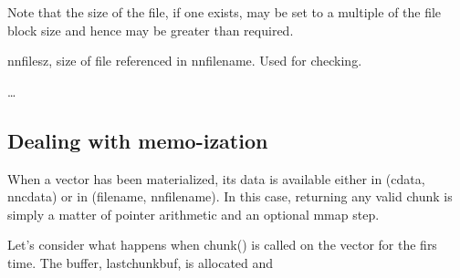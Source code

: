 Note that the size of the file, if one exists, may be set to a
multiple of the file block size and hence may be greater than
required.
\item nnfilesz, size of file referenced in nnfilename. Used for checking.
\item \ldots
\ee

\ee

\subsection{Dealing with memo-ization}

When a vector has been materialized, its data is available either in (cdata,
nncdata) or in (filename, nnfilename). In this case, returning any valid chunk
is simply a matter of pointer arithmetic and an optional mmap step.

Let's consider what happens when chunk() is called on the vector for the firs
time. The buffer, lastchunkbuf, is allocated and 

